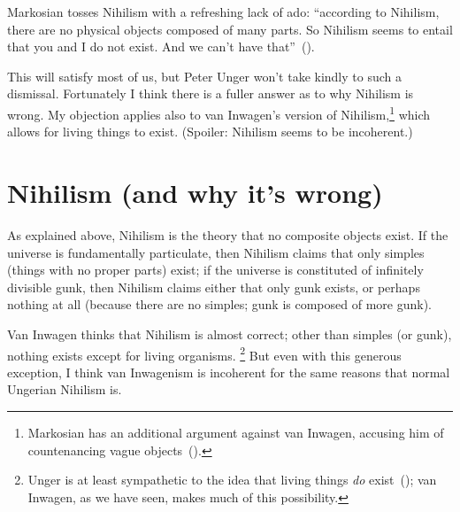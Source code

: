 Markosian tosses Nihilism with a refreshing lack of ado: ``according to Nihilism, there are no physical objects composed of many parts. So Nihilism seems to entail that you and I do not exist. And we can't have that''~(\citeyear[220]{markosian1998a}).

This will satisfy most of us, but Peter Unger won't take kindly to such a dismissal. Fortunately I think there is a fuller answer as to why Nihilism is wrong. My objection applies also to van Inwagen's version of Nihilism,\footnote{Markosian has an additional argument against van Inwagen, accusing him of countenancing vague objects~(\citeyear[222--223]{markosian1998a}).} which allows for living things to exist. (Spoiler: Nihilism seems to be incoherent.)

\section{Nihilism (and why it's wrong)}
As explained above, Nihilism is the theory that no composite objects exist. If the universe is fundamentally particulate, then Nihilism claims that only simples (things with no proper parts) exist; if the universe is constituted of infinitely divisible gunk, then Nihilism claims either that only gunk exists, or perhaps nothing at all (because there are no simples; gunk is composed of more gunk).

Van Inwagen thinks that Nihilism is almost correct; other than simples (or gunk), nothing exists except for living organisms.%
%
\footnote{Unger is at least sympathetic to the idea that living things {\em do} exist~(\citeyear[151]{unger1979}); van Inwagen, as we have seen, makes much of this possibility.} %
%
But even with this generous exception, I think van Inwagenism is incoherent for the same reasons that normal Ungerian Nihilism is.

